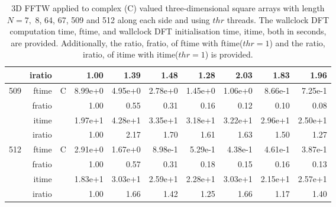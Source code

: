 \documentclass[a4paper]{article}
\begin{document}
\begin{table}[htbp]
\begin{center}
\begin{small}
\begin{tabular}{|r|r|r|r|r|r|r|r|r|r|}
     & iratio & &      1.00 &   1.39 &   1.48 &   1.28 &   2.03 &   1.83 &   1.96       \\ \hline 
  509  & ftime & C  &  8.99e+0 &   4.95e+0 &   2.78e+0 &   1.45e+0 &   1.06e+0 &   8.66e-1 &   7.25e-1    \\ 
      & fratio & &     1.00 &   0.55 &   0.31 &   0.16 &   0.12 &   0.10 &   0.08    \\ 
     & itime & &       1.97e+1 &   4.28e+1 &   3.35e+1 &   3.18e+1 &   3.22e+1 &   2.96e+1 &   2.50e+1       \\ 
     & iratio & &      1.00 &   2.17 &   1.70 &   1.61 &   1.63 &   1.50 &   1.27       \\ \hline 
  512  & ftime & C  &  2.91e+0 &   1.67e+0 &   8.98e-1 &   5.29e-1 &   4.38e-1 &   4.61e-1 &   3.87e-1     \\ 
      & fratio & &     1.00 &   0.57 &   0.31 &   0.18 &   0.15 &   0.16 &   0.13       \\ 
     & itime & &       1.83e+1 &   3.03e+1 &   2.59e+1 &   2.28e+1 &   3.03e+1 &   2.15e+1 &   2.57e+1       \\ 
     & iratio & &      1.00 &   1.66 &   1.42 &   1.25 &   1.66 &   1.17 &   1.40       \\ \hline
\end{tabular}
\caption{3D FFTW applied to complex (C) valued three-dimensional square arrays with length
  $N=7,$ 8, 64, 67, 509 and 512 along each side and using $thr$ threads. The wallclock DFT computation time,
  ftime, and wallclock DFT initialisation time, itime, both in seconds, are provided. Additionally,  the ratio,
  fratio, of ftime  with ftime($thr=1$) and the ratio, iratio, of itime  with itime($thr=1$) is provided. }\label{TblFFTW3dc}
\end{small}
\end{center}
\end{table}
\end{document}
